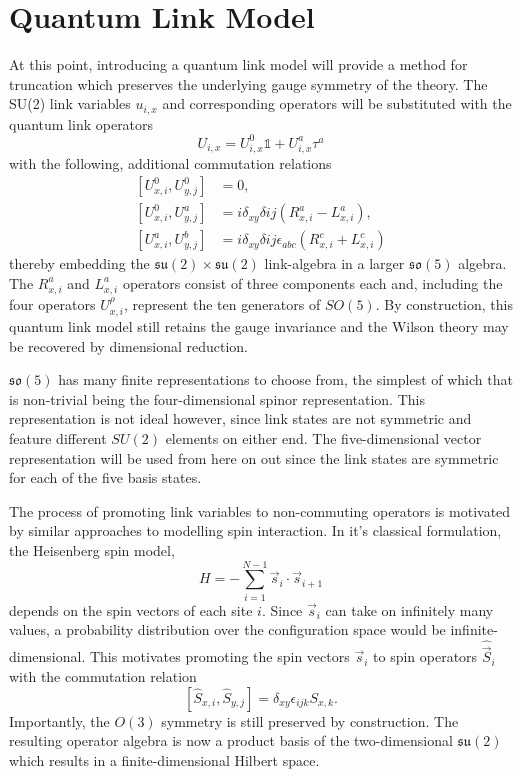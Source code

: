 \documentclass[a4paper,oneside, 11pt,english,listof=totoc,bibliography=totoc]{scrbook}
\begin{document}
\section{Quantum Link Model}
At this point, introducing a quantum link model will provide a method for truncation which preserves the underlying gauge symmetry of the theory. The SU(2) link variables $u_{i,x}$ and corresponding operators will be substituted with the quantum link operators
\begin{equation}\label{eq:qlo}
    U_{i,x}=U^0_{i,x}\mathds{1}+U^a_{i,x}\tau^a
\end{equation}
with the following, additional commutation relations
\begin{equation}\label{eq:u-commutation}
    \begin{array}{rl}
        \left[U^0_{x,i},U^0_{y,j}\right]&=0, \\
        \left[U^0_{x,i},U^a_{y,j}\right]&=i\delta_{xy}\delta{ij}\left(R^a_{x,i}-L^a_{x,i}\right), \\
        \left[U^a_{x,i},U^b_{y,j}\right]&=i\delta_{xy}\delta{ij}\epsilon_{abc}\left(R^c_{x,i}+L^c_{x,i}\right)
    \end{array}
\end{equation}
thereby embedding the $\mathfrak{su}(2)\times\mathfrak{su}(2)$ link-algebra in a larger $\mathfrak{so}(5)$ algebra. The $R^a_{x,i}$ and $L^a_{x,i}$ operators consist of three components each and, including the four operators $U^\rho_{x,i}$, represent the ten generators of $SO(5)$. By construction, this quantum link model still retains the gauge invariance and the Wilson theory may be recovered by dimensional reduction\cite{Chandrasekharan, Beard}.

$\mathfrak{so}(5)$ has many finite representations to choose from, the simplest of which that is non-trivial being the four-dimensional spinor representation. This representation is not ideal however, since link states are not symmetric and feature different $SU(2)$ elements on either end. The five-dimensional vector representation will be used from here on out since the link states are symmetric for each of the five basis states.

The process of promoting link variables to non-commuting operators is motivated by similar approaches to modelling spin interaction. In it's classical formulation, the Heisenberg spin model,
\begin{equation*}
    H=-\sum\limits_{i=1}^{N-1}\vec{s}_i\cdot\vec{s}_{i+1}
\end{equation*}
depends on the spin vectors of each site $i$. Since $\vec{s}_i$ can take on infinitely many values, a probability distribution over the configuration space would be infinite-dimensional. This motivates promoting the spin vectors $\vec{s}_i$ to spin operators $\hat{\vec{S}}_i$ with the commutation relation
$$[\hat{S}_{x,i},\hat{S}_{y,j}]=\delta_{xy}\epsilon_{ijk}S_{x,k}.$$
Importantly, the $O(3)$ symmetry is still preserved by construction. The resulting operator algebra is now a product basis of the two-dimensional $\mathfrak{su}(2)$ which results in a finite-dimensional Hilbert space.
\end{document}
